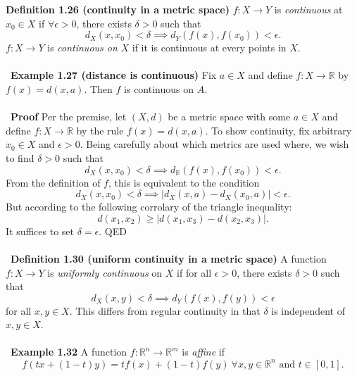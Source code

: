 \documentclass[12 pt]{article}
\newcommand{\R}{\mathbb{R}}
\numberwithin{equation}{section}
\begin{document}
{\textbf{Definition 1.26 (continuity in a metric space)} $f: X \to Y$ is \textit{continuous} at $x_0 \in X$ if $\forall \epsilon >0$, there exists $\delta > 0$ such that \begin{equation*}
d_X(x, x_0) < \delta \implies d_Y(f(x), f(x_0)) < \epsilon.
\end{equation*}
$f:X \to Y$ is \textit{continuous on} $X$ if it is continuous at every points in $X$.\\
\\
\
\textbf{Example 1.27 (distance is continuous)} Fix $a \in X$ and define $f: X \to \R$ by $f(x) = d(x, a)$. Then $f$ is continuous on $A$.\\
\\
\
\textbf{Proof} Per the premise, let $(X, d)$ be a metric space with some $a \in X$ and define $f: X \to \R$ by the rule $f(x) = d(x,a)$. To show continuity, fix arbitrary $x_0 \in X$ and $\epsilon > 0$. Being carefully about which metrics are used where, we wish to find $\delta > 0$ such that \begin{equation*}
d_X(x, x_0) < \delta \implies d_{\R} (f(x), f(x_0)) < \epsilon.
\end{equation*}
From the definition of $f$, this is equivalent to the condition \begin{equation*}
d_X(x, x_0) < \delta \implies |d_X(x, a) - d_X(x_0,a)| < \epsilon.
\end{equation*}
But according to the following corrolary of the triangle inequality: \begin{equation*}
d(x_1, x_2) \geq |d(x_1, x_3) - d(x_2, x_3)|.
\end{equation*}
It suffices to set $\delta = \epsilon$. QED\\
\\
\
\textbf{Definition 1.30 (uniform continuity in a metric space)} A function $f: X \to Y$ is \textit{uniformly continuous} on $X$ if for all $\epsilon > 0$, there exists $\delta > 0$ such that 
\begin{equation*}
d_X(x,y) < \delta \implies d_Y(f(x), f(y)) < \epsilon
\end{equation*}
for all $x, y \in X$. This differs from regular continuity in that $\delta$ is independent of  $x, y \in X$.\\
\\
\
\textbf{Example 1.32} A function $f: \R^n \to \R^m$ is \textit{affine} if \begin{equation*}
f(tx + (1-t)y) = t f(x) + (1-t)f(y) \ \forall x, y \in \R^n \mbox{ and } t \in [0,1].
\end{equation*}
}
\end{document}
